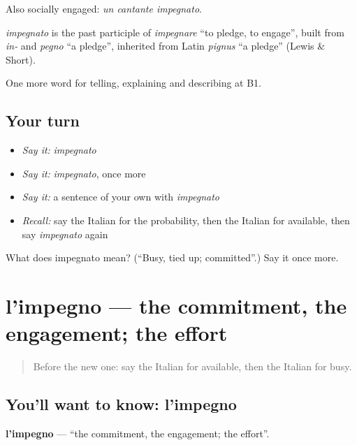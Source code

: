 Also socially engaged: \emph{un cantante impegnato}.

\begin{cousinweb}
\emph{impegnato} is the past participle of \emph{impegnare} \textquotedblleft{}to pledge, to engage\textquotedblright{}, built from \emph{in-} and \emph{pegno} \textquotedblleft{}a pledge\textquotedblright{}, inherited from Latin \emph{pignus} \textquotedblleft{}a pledge\textquotedblright{} (Lewis \& Short).
\end{cousinweb}

\begin{grammarlens}[title={What you've built}]
One more word for telling, explaining and describing at B1.
\end{grammarlens}

\subsection*{Your turn}
\begin{itemize}
\raggedright
  \item \emph{Say it:} \emph{impegnato}
  \item \emph{Say it:} \emph{impegnato}, once more
  \item \emph{Say it:} a sentence of your own with \emph{impegnato}
  \item \emph{Recall:} say the Italian for the probability, then the Italian for available, then say \emph{impegnato} again
\end{itemize}

\begin{tcolorbox}[breakable,colback=teal!4,colframe=teal!35!black,title={Before you move on}]
What does impegnato mean? (\textquotedblleft{}Busy, tied up; committed\textquotedblright{}.) Say it once more.
\end{tcolorbox}
\section[l'impegno]{l'impegno — the commitment, the engagement; the effort}

\label{lesson:IT-C377-impegno}



\begin{quote}
Before the new one: say the Italian for available, then the Italian for busy.
\end{quote}

\subsection*{You'll want to know: l'impegno}
\textbf{l'impegno} — \textquotedblleft{}the commitment, the engagement; the effort\textquotedblright{}.

